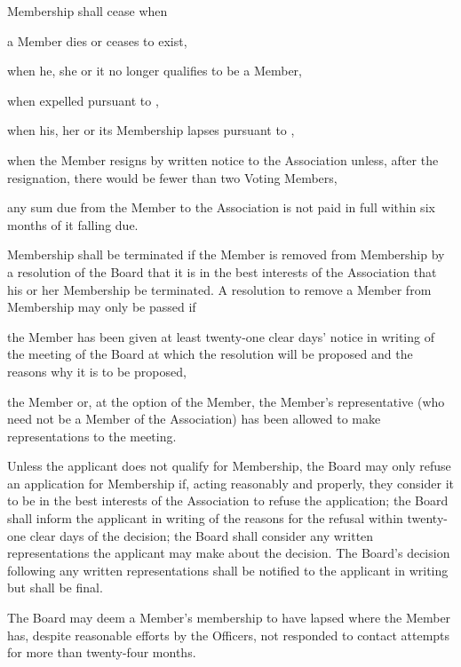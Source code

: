 \documentclass[10pt]{mk-articles-of-association}
\newcommand{\EC}[0]{Board}
\newcommand{\Exec}[0]{\EC{} }
\begin{document}
\begin{constenum}

  \item
    Membership shall cease when
    \begin{constenum}
      \item a Member dies or ceases to exist,
      \item when he, she or it no longer qualifies to be a Member,
      \item when expelled pursuant to ,
      \item when his, her or its Membership lapses pursuant to
        ,
      \item when the Member resigns by written notice to the
        Association unless, after the resignation, there would be
        fewer than two Voting Members, \ITor{}
      \item any sum due from the Member to the Association is not paid in full
        within six months of it falling due.
    \end{constenum}

\item Membership shall be terminated if
\label{expulsion}
  the Member is removed from Membership by a resolution of the
  \Exec that it is in the best interests of the Association that his or
  her Membership be terminated. A resolution to remove a Member from
  Membership may only be passed if

\begin{constenum}

\item the Member has been given at least twenty-one clear days' notice in
  writing of the meeting of the \Exec at which the resolution will
  be proposed and the reasons why it is to be proposed,

\item the Member or, at the option of the Member, the Member's
  representative (who need not be a Member of the Association) has been
  allowed to make representations to the meeting.

\end{constenum}

\item
  Unless the applicant does not qualify for Membership, the \Exec
  may only refuse an application for Membership if, acting
  reasonably and properly, they consider it to be in the best
  interests of the Association to refuse the application; the \Exec
  shall inform the applicant in writing of the reasons for the
  refusal within twenty-one clear days of the decision; the \Exec
  shall consider any written representations the applicant may make
  about the decision. The \EC's decision following any written
  representations shall be notified to the applicant in writing but
  shall be final.

\item The \Exec may deem a Member's membership to have lapsed where
  the Member has, despite reasonable efforts by the Officers, not
  responded to contact attempts for more than twenty-four months.
  \label{lapse}

\end{constenum}
\end{document}
